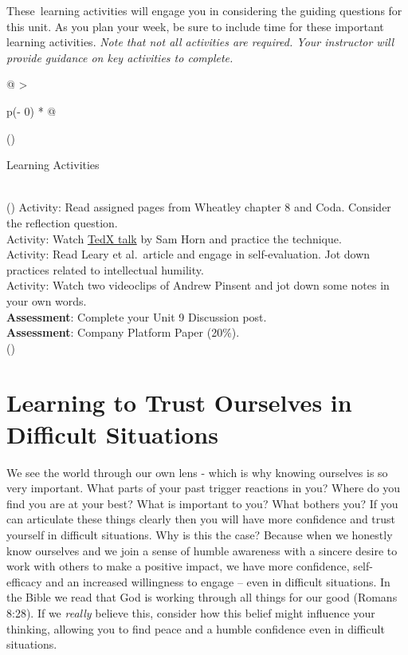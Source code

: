 \documentclass[
]{book}
\begin{document}
These~learning activities will engage you in considering the guiding questions for this unit. As you plan your week, be sure to include time for these important learning activities. \emph{Note that not all activities are required. Your instructor will provide guidance on key activities to complete.}

\begin{longtable}[]{@{}
  >{\raggedright\arraybackslash}p{(\columnwidth - 0\tabcolsep) * }@{}}
\toprule()
\begin{minipage}[b]{\linewidth}\raggedright
Learning Activities
\end{minipage} \\
\midrule()
\endhead
Activity: Read assigned pages from Wheatley chapter 8 and Coda. Consider the reflection question. \\
Activity: Watch \href{https://youtu.be/Xlg8zdSVjgg}{TedX talk} by Sam Horn and practice the technique. \\
Activity: Read Leary et al.~article and engage in self-evaluation. Jot down practices related to intellectual humility. \\
Activity: Watch two videoclips of Andrew Pinsent and jot down some notes in your own words. \\
\textbf{Assessment}: Complete your Unit 9 Discussion post. \\
\textbf{Assessment}: Company Platform Paper (20\%). \\
\bottomrule()
\end{longtable}

\hypertarget{learning-to-trust-ourselves-in-difficult-situations}{%
\section{Learning to Trust Ourselves in Difficult Situations}\label{learning-to-trust-ourselves-in-difficult-situations}}

We see the world through our own lens - which is why knowing ourselves is so very important. What parts of your past trigger reactions in you? Where do you find you are at your best? What is important to you? What bothers you? If you can articulate these things clearly then you will have more confidence and trust yourself in difficult situations. Why is this the case? Because when we honestly know ourselves and we join a sense of humble awareness with a sincere desire to work with others to make a positive impact, we have more confidence, self-efficacy and an increased willingness to engage -- even in difficult situations. In the Bible we read that God is working through all things for our good (Romans 8:28). If we \emph{really} believe this, consider how this belief might influence your thinking, allowing you to find peace and a humble confidence even in difficult situations.
\end{document}
